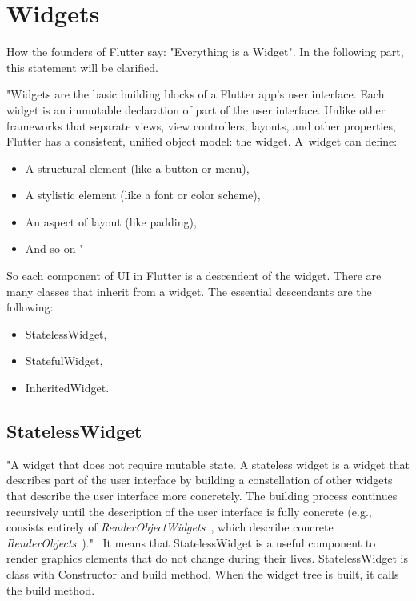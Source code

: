 \section{Widgets}\label{sec:widgets}
How the founders of Flutter say: "Everything is a Widget".
In the following part, this statement will be clarified.

"Widgets are the basic building blocks of a Flutter app's user interface.
Each widget is an immutable declaration of part of the user interface.
Unlike other frameworks that separate views, view controllers, layouts, and other properties, Flutter has a consistent, unified object model: the widget.
A~widget can define:
\begin{itemize}
    \item A structural element (like a button or menu),
    \item A stylistic element (like a font or color scheme),
    \item An aspect of layout (like padding),
    \item And so on \textellipsis"~\cite{flutterTechnicalOverview}
\end{itemize}
So each component of UI in Flutter is a descendent of the widget.
There are many classes that inherit from a widget.
The essential descendants are the following:
\begin{itemize}
    \item StatelessWidget,
    \item StatefulWidget,
    \item InheritedWidget.
\end{itemize}


\subsection{StatelessWidget}\label{subsec:statelesswidget}
"A widget that does not require mutable state.
A stateless widget is a widget that describes part of the user interface by building a constellation of other widgets that describe the user interface more concretely.
The building process continues recursively until the description of the user interface is fully concrete (e.g., consists entirely of
\textit{RenderObjectWidgets}~\cite{renderObjectWidget}, which describe concrete \textit{RenderObjects}~\cite{renderObject})."~\cite{statelessWidget}
It means that StatelessWidget is a useful component to render graphics elements that do not change during their lives.
StatelessWidget is class with Constructor and build method.
When the widget tree is built, it calls the build method.

